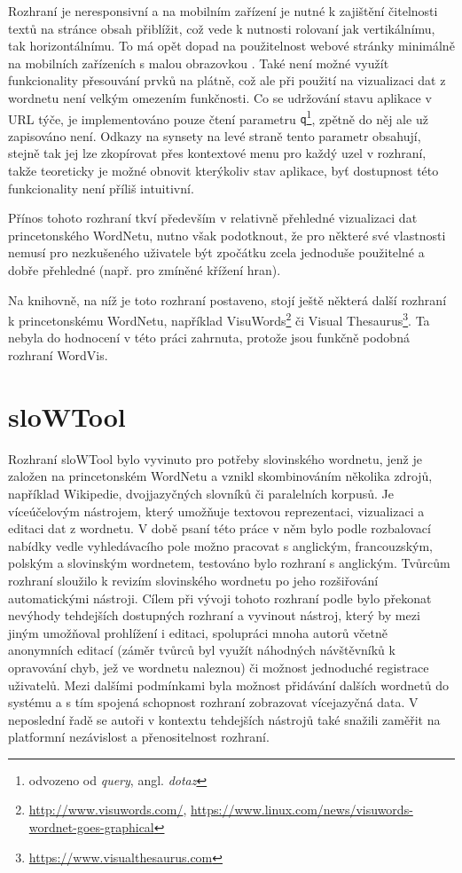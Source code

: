\documentclass[a4paper, 11pt, oneside]{book}
\begin{document}
				Rozhraní je neresponsivní a na mobilním zařízení je nutné k zajištění čitelnosti textů na stránce obsah přiblížit, což vede k nutnosti rolovaní jak vertikálnímu, tak horizontálnímu. To má opět dopad na použitelnost webové stránky minimálně na mobilních zařízeních s malou obrazovkou \parencite{nn2005scrollbar, richards2004web}. Také není možné využít funkcionality přesouvání prvků na plátně, což ale při použití na vizualizaci dat z wordnetu není velkým omezením funkčnosti. Co se udržování stavu aplikace v URL týče, je implementováno pouze čtení parametru {\tt q}\footnote{odvozeno od \textit{query}, angl. \textit{dotaz}}, zpětně do něj ale už zapisováno není. Odkazy na synsety na levé straně tento parametr obsahují, stejně tak jej lze zkopírovat přes kontextové menu pro každý uzel v rozhraní, takže teoreticky je možné obnovit kterýkoliv stav aplikace, byť dostupnost této funkcionality není příliš intuitivní.

				Přínos tohoto rozhraní tkví především v relativně přehledné vizualizaci dat princetonského WordNetu, nutno však podotknout, že pro některé své vlastnosti nemusí pro nezkušeného uživatele být zpočátku zcela jednoduše použitelné a dobře přehledné (např. pro zmíněné křížení hran).

				Na knihovně, na níž je toto rozhraní postaveno, stojí ještě některá další rozhraní k princetonskému WordNetu, například VisuWords\footnote{\url{http://www.visuwords.com/}, \url{https://www.linux.com/news/visuwords-wordnet-goes-graphical}} či Visual Thesaurus\footnote{\url{https://www.visualthesaurus.com}}. Ta nebyla do hodnocení v této práci zahrnuta, protože jsou funkčně podobná rozhraní WordVis.

			\section{sloWTool}
			\label{vis:slowtool}

				Rozhraní sloWTool bylo vyvinuto pro potřeby slovinského wordnetu, jenž je založen na princetonském WordNetu a vznikl skombinováním několika zdrojů, například Wikipedie, dvojjazyčných slovníků či paralelních korpusů. Je víceúčelovým nástrojem, který umožňuje textovou reprezentaci, vizualizaci a editaci dat z wordnetu. V době psaní této práce v něm bylo podle rozbalovací nabídky vedle vyhledávacího pole možno pracovat s anglickým, francouzským, polským a slovinským wordnetem, testováno bylo rozhraní s anglickým. Tvůrcům rozhraní sloužilo k revizím slovinského wordnetu po jeho rozšiřování automatickými nástroji. \parencite{fivser2012slownet} Cílem při vývoji tohoto rozhraní podle \textcite{fivser2011visualizing} bylo překonat nevýhody tehdejších dostupných rozhraní a vyvinout nástroj, který by mezi jiným umožňoval prohlížení i editaci, spolupráci mnoha autorů včetně anonymních editací (záměr tvůrců byl využít náhodných návštěvníků k opravování chyb, jež ve wordnetu naleznou) či možnost jednoduché registrace uživatelů. Mezi dalšími podmínkami byla možnost přidávání dalších wordnetů do systému a s tím spojená schopnost rozhraní zobrazovat vícejazyčná data. V neposlední řadě se autoři v kontextu tehdejších nástrojů také snažili zaměřit na platformní nezávislost a přenositelnost rozhraní. 
\end{document}
